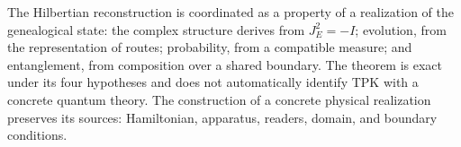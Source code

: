 \begin{statusbox}[title={Result and scope}]
The Hilbertian reconstruction is coordinated as a property of a
realization of the genealogical state: the complex structure derives from
\(J_E^2=-I\); evolution, from the representation of routes; probability,
from a compatible measure; and entanglement, from composition over a
shared boundary. The theorem is exact under its four hypotheses and does not
automatically identify TPK with a concrete quantum theory. The
construction of a concrete physical realization preserves its sources:
Hamiltonian, apparatus, readers, domain, and boundary conditions.
\end{statusbox}
